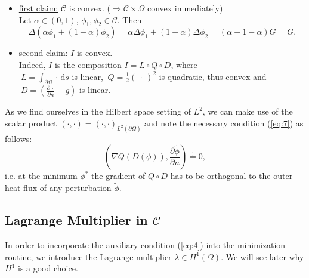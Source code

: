 \begin{itemize}
	\item \underline{first claim:} $\mathcal C$ is convex. ($\Rightarrow \mathcal{C}\times\Omega$ convex immediately)\\
	Let $\alpha\in(0,1)$, $\phi_1,\phi_2\in\mathcal C$. Then
	\begin{equation*}
		\Delta \left(\alpha\phi_1 + (1-\alpha)\phi_2\right)
		= \alpha \Delta \phi_1 + (1-\alpha)\Delta\phi_2
		= (\alpha + 1 - \alpha)G = G.
	\end{equation*}
	\item \underline{second claim:} $I$ is convex.\\
	Indeed, $I$ is the composition $I = L\circ Q\circ D$, where\\
	$\:L=\int_{\partial\Omega}\cdot\,\mathrm ds$ is linear, $\:Q=\frac{1}{2}(\:\cdot\:)^2$ is quadratic, thus convex and $\:D=(\frac{\partial\,\cdot}{\partial n}-g)$ is linear.
\end{itemize}
As we find ourselves in the Hilbert space setting of $L^2$, we can make use of the scalar product $\left(\cdot,\cdot\right) = \left(\cdot,\cdot\right)_{L^2(\partial \Omega)}$ and note the necessary condition (\ref{eq:7}) as follows:
\begin{equation}\label{eq:8}
	\left(\nabla Q(D(\phi)),\frac{\partial \widetilde{\phi}}{\partial n}\right)
	\overset{!}{=}0,
\end{equation}
i.e. at the minimum $\phi^*$ the gradient of $Q\circ D$ has to be orthogonal to the outer heat flux of any perturbation $\widetilde{\phi}$.

\subsection{Lagrange Multiplier in $\mathcal C$}
In order to incorporate the auxiliary condition (\ref{eq:4}) into the minimization routine, we introduce the Lagrange multiplier $\lambda\in H^1(\Omega)$. We will see later why $H^1$ is a good choice.

